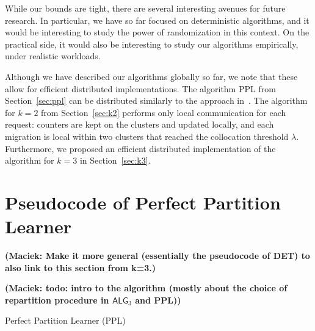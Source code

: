\documentclass[a4paper,anonymous,USenglish]{lipics-v2019}
\newcommand{\PPL}{\textsc{PPL}\xspace}
\newcommand{\TAlg}{{\ensuremath{\textsf{ALG}_{3}}}\xspace}
\DeclarePairedDelimiter\set{\{}{\}}
\newcommand\maciek[1]{\color{brown}\textbf{(Maciek: #1)}\color{black}}
\begin{document}
While our bounds are tight, there are several interesting avenues for future research.
In particular, we have so far focused on deterministic algorithms, and it would be interesting to study the power of randomization in this context.
On the practical side, it would also be interesting to study our algorithms empirically, under realistic workloads.

Although we have described our algorithms globally so far, we note that these allow for efficient distributed implementations. 
The algorithm PPL from Section~\ref{sec:ppl} can be distributed
similarly to the approach in~\cite{sigmetrics19_partitioning}.
The algorithm for $k=2$ from Section~\ref{sec:k2} performs only local communication for each request: counters are kept on the clusters and updated locally, and each migration is local within two clusters that reached the collocation threshold $\lambda$.
Furthermore, we proposed an efficient distributed implementation of the algorithm for $k=3$ in Section~\ref{sec:k3}.




\appendix

\section{Pseudocode of Perfect Partition Learner}

\maciek{Make it more general (essentially the pseudocode of DET) to also link to this section from k=3.}

\maciek{todo: intro to the algorithm (mostly about the choice of repartition procedure in \TAlg and PPL)}

\begin{algorithm}
	\renewcommand{\algorithmicrequire}{\textbf{Input:}}
	\renewcommand{\algorithmicensure}{\textbf{Output:}}
	\begin{algorithmic}
		\label{line:initcomponents}
		 \label{line:mergecomponents}
		\label{line:rebalance} 
		\ENDIF
		\ENDIF
		\ENDFOR
	\end{algorithmic}
	\caption{Perfect Partition Learner (\PPL)}
	\label{alg:ppl}
\end{algorithm}
\end{document}
